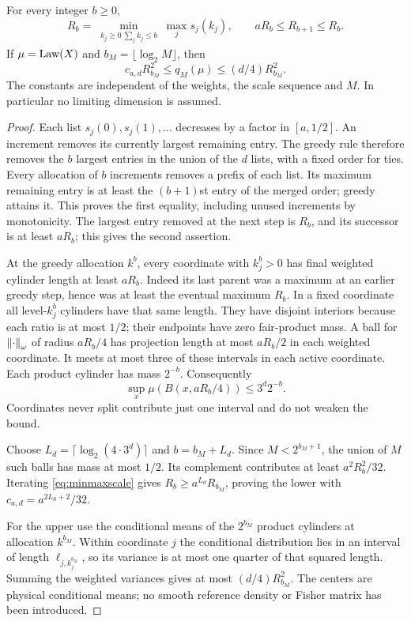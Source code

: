 \begin{lemma}\label{lem:greedy}
For every integer $b\ge0$,
\begin{equation}\label{eq:minmaxscale}
 R_b=\min_{\substack{k_j\ge0\ \sum_jk_j\le b}}\max_j s_j(k_j),
 \qquad aR_b\le R_{b+1}\le R_b.
\end{equation}
If $\mu=\operatorname{Law}(X)$ and $b_M=\lfloor\log_2M\rfloor$, then
\begin{equation}\label{eq:physicalquant}
 c_{a,d}R_{b_M}^2\le q_M(\mu)\le(d/4)R_{b_M}^2.
\end{equation}
The constants are independent of the weights, the scale sequence and $M$. In particular no limiting dimension is assumed.
\end{lemma}
\begin{proof}
Each list $s_j(0),s_j(1),\ldots$ decreases by a factor in $[a,1/2]$. An increment removes its currently largest remaining entry. The greedy rule therefore removes the $b$ largest entries in the union of the $d$ lists, with a fixed order for ties. Every allocation of $b$ increments removes a prefix of each list. Its maximum remaining entry is at least the $(b+1)$st entry of the merged order; greedy attains it. This proves the first equality, including unused increments by monotonicity. The largest entry removed at the next step is $R_b$, and its successor is at least $aR_b$; this gives the second assertion.

At the greedy allocation $k^b$, every coordinate with $k_j^b>0$ has final weighted cylinder length at least $aR_b$. Indeed its last parent was a maximum at an earlier greedy step, hence was at least the eventual maximum $R_b$. In a fixed coordinate all level-$k_j^b$ cylinders have that same length. They have disjoint interiors because each ratio is at most $1/2$; their endpoints have zero fair-product mass. A ball for $\left\lVert\cdot\right\rVert_\omega$ of radius $aR_b/4$ has projection length at most $aR_b/2$ in each weighted coordinate. It meets at most three of these intervals in each active coordinate. Each product cylinder has mass $2^{-b}$. Consequently
\begin{equation}\label{eq:productsmallball}
 \sup_x\mu(B(x,aR_b/4))\le3^d2^{-b}.
\end{equation}
Coordinates never split contribute just one interval and do not weaken the bound.

Choose $L_d=\lceil\log_2(4\cdot3^d)\rceil$ and $b=b_M+L_d$. Since $M<2^{b_M+1}$, the union of $M$ such balls has mass at most $1/2$. Its complement contributes at least $a^2R_b^2/32$. Iterating \eqref{eq:minmaxscale} gives $R_b\ge a^{L_d}R_{b_M}$, proving the lower with $c_{a,d}=a^{2L_d+2}/32$.

For the upper use the conditional means of the $2^{b_M}$ product cylinders at allocation $k^{b_M}$. Within coordinate $j$ the conditional distribution lies in an interval of length $\ell_{j,k_j^{b_M}}$, so its variance is at most one quarter of that squared length. Summing the weighted variances gives at most $(d/4)R_{b_M}^2$. The centers are physical conditional means; no smooth reference density or Fisher matrix has been introduced.
\end{proof}

